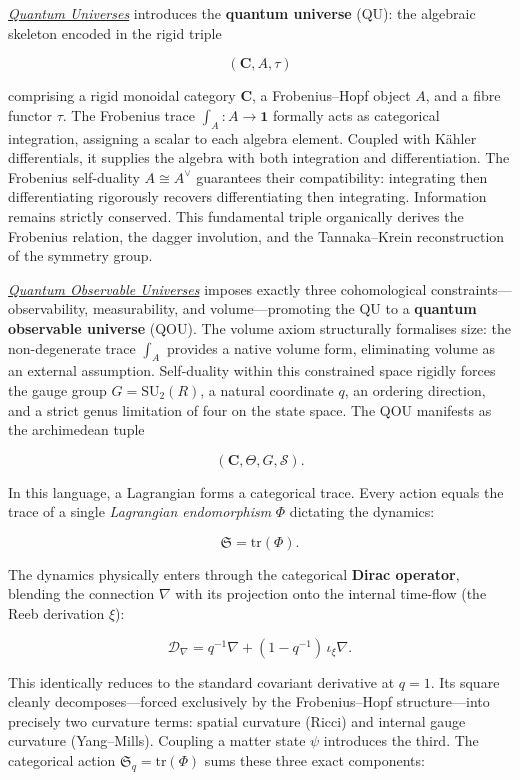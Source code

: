 \hyperref[chap:qu]{\emph{Quantum Universes}} introduces the \textbf{quantum universe} (QU): the algebraic skeleton encoded in the rigid triple

\[
  (\mathbf{C}, A, \tau)
\]

comprising a rigid monoidal category $\mathbf{C}$, a Frobenius–Hopf object $A$, and a fibre functor $\tau$. The Frobenius trace $\int_A \colon A \to \mathbf{1}$ formally acts as categorical integration, assigning a scalar to each algebra element. Coupled with Kähler differentials, it supplies the algebra with both integration and differentiation. The Frobenius self-duality $A \cong A^{\vee}$ guarantees their compatibility: integrating then differentiating rigorously recovers differentiating then integrating. Information remains strictly conserved. This fundamental triple organically derives the Frobenius relation, the dagger involution, and the Tannaka–Krein reconstruction of the symmetry group.

\hyperref[chap:qou]{\emph{Quantum Observable Universes}} imposes exactly three cohomological constraints—observability, measurability, and volume—promoting the QU to a \textbf{quantum observable universe} (QOU). The volume axiom structurally formalises size: the non-degenerate trace $\int_A$ provides a native volume form, eliminating volume as an external assumption. Self-duality within this constrained space rigidly forces the gauge group $G = \mathrm{SU}_2(R)$, a natural coordinate $q$, an ordering direction, and a strict genus limitation of four on the state space. The QOU manifests as the archimedean tuple

\[
  (\mathbf{C}, \varTheta, G, \mathcal{S}).
\]

In this language, a Lagrangian forms a categorical trace. Every action equals the trace of a single \emph{Lagrangian endomorphism} $\Phi$ dictating the dynamics:

\[
  \mathfrak{S} = \mathrm{tr}(\Phi).
\]

The dynamics physically enters through the categorical \textbf{Dirac operator}, blending the connection $\nabla$ with its projection onto the internal time-flow (the Reeb derivation $\xi$):

\[
  \mathcal{D}_\nabla = q^{-1}\nabla + (1 - q^{-1})\,\iota_\xi\nabla.
\]

This identically reduces to the standard covariant derivative at $q = 1$. Its square cleanly decomposes—forced exclusively by the Frobenius–Hopf structure—into precisely two curvature terms: spatial curvature (Ricci) and internal gauge curvature (Yang–Mills). Coupling a matter state $\psi$ introduces the third. The categorical action $\mathfrak{S}_q = \mathrm{tr}(\Phi)$ sums these three exact components:

